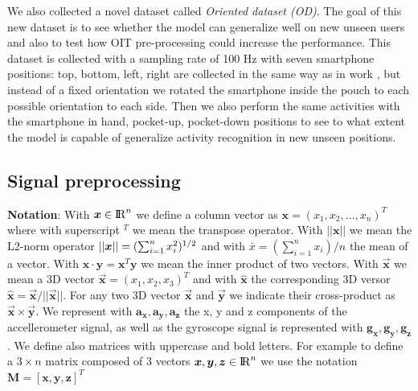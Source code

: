 We also collected a novel dataset called \textit{Oriented dataset (OD)}. The goal of this new dataset is to see whether the model can generalize well on new unseen users and also to test how OIT pre-processing could increase the performance. This dataset is collected with a sampling rate of 100 Hz with seven smartphone positions: top, bottom, left, right are collected in the same way as in work \cite{blunck2013heterogeneity}, but instead of a fixed orientation we rotated the smartphone inside the pouch to each possible orientation to each side. Then we also perform the same activities with the smartphone in hand, pocket-up, pocket-down positions to see to what extent the model is capable of generalize activity recognition in new unseen positions.

\subsection{Signal preprocessing}

\textbf{Notation}: With $\boldsymbol{x} \in {\rm I\!R}^{n}$ we define a column vector as $\boldsymbol{x}=(x_{1}, x_{2}, ..., x_{n})^{T}$ where with superscript $^T$ we mean the transpose operator. With $\boldsymbol{||x||}$ we mean the L2-norm operator $||\boldsymbol{x}|| = (\sum_{i=1}^{n} x_{i}^{2})^{1/2}$ and with $\bar{x} = (\sum_{i=1}^{n} x_{i}) / n$ the mean of a vector. With $\boldsymbol{x} \cdot \boldsymbol{y} =\boldsymbol{x}^{T}\boldsymbol{y} $ we mean the inner product of two vectors. With $\boldsymbol{\vec{x}}$ we mean a 3D vector $\boldsymbol{\vec{x}} = (x_{1}, x_{2}, x_{3})^{T}$ and with $\boldsymbol{\hat{x}}$ the corresponding 3D versor $\boldsymbol{\hat{x}}=\boldsymbol{\vec{x}}/ ||\boldsymbol{\vec{x}}||$. For any two 3D vector $\boldsymbol{\vec{x}}$ and $\boldsymbol{\vec{y}}$ we indicate their cross-product as $\boldsymbol{\vec{x}} \times \boldsymbol{\vec{y}}$. We represent with $\boldsymbol{a_{x}}, \boldsymbol{a_{y}}, \boldsymbol{a_{z}}$ the x, y and z components of the accellerometer signal, as well as the gyroscope signal is represented with $\boldsymbol{g_{x}}, \boldsymbol{g_{y}}, \boldsymbol{g_{z}}$. We define also matrices with uppercase and bold letters. For example to define a $3 \times n$ matrix composed of 3 vectors \mbox{$\boldsymbol{x}, \boldsymbol{y}, \boldsymbol{z} \in {\rm I\!R}^{n}$} we use the notation \mbox{$\boldsymbol{M} = [\boldsymbol{x}, \boldsymbol{y}, \boldsymbol{z}]^{T}$}\\

